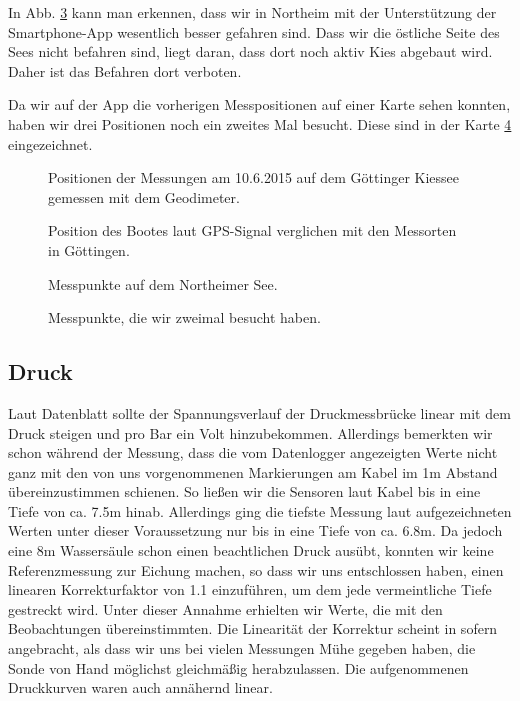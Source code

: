 \documentclass[12pt,a4paper,titlepage,headinclude,bibtotoc]{scrartcl}
\numberwithin{equation}{subsection}
\begin{document}
In Abb. \ref{fig:GPSNort} kann man erkennen, dass wir in Northeim mit der Unterstützung der Smartphone-App wesentlich besser gefahren sind.
Dass wir die östliche Seite des Sees nicht befahren sind, liegt daran, dass dort noch aktiv Kies abgebaut wird.
Daher ist das Befahren dort verboten.

Da wir auf der App die vorherigen Messpositionen auf einer Karte sehen konnten, haben wir drei Positionen noch ein zweites Mal besucht.
Diese sind in der Karte \ref{fig:GPSNortZweimal} eingezeichnet.


\begin{figure}[h]
\centering

\caption{Positionen der Messungen am 10.6.2015 auf dem Göttinger Kiessee gemessen mit dem Geodimeter.}
\label{fig:einzelGPSGoe}
\end{figure}
\begin{figure}[h]
\centering

\caption{Position des Bootes laut GPS-Signal verglichen mit den Messorten in Göttingen.}
\label{fig:GPSGoe}
\end{figure}

\begin{figure}[h]
	\centering
	
	\caption{Messpunkte auf dem Northeimer See.}
	\label{fig:GPSNort}
\end{figure}
\begin{figure}[h]
	\centering
	
	\caption{Messpunkte, die wir zweimal besucht haben.}
	\label{fig:GPSNortZweimal}
\end{figure}




\subsection{Druck}
\label{sec:ausdruck}
Laut Datenblatt sollte der Spannungsverlauf der Druckmessbrücke linear mit dem Druck steigen und pro Bar ein Volt hinzubekommen.
Allerdings bemerkten wir schon während der Messung, dass die vom Datenlogger angezeigten Werte nicht ganz mit den von uns vorgenommenen Markierungen am Kabel im 1m Abstand übereinzustimmen schienen.
So ließen wir die Sensoren laut Kabel bis in eine Tiefe von ca. 7.5m hinab.
Allerdings ging die tiefste Messung laut aufgezeichneten Werten unter dieser Voraussetzung nur bis in eine Tiefe von ca. 6.8m.
Da jedoch eine 8m Wassersäule schon einen beachtlichen Druck ausübt, konnten wir keine Referenzmessung zur Eichung machen, so dass wir uns entschlossen haben, einen linearen Korrekturfaktor von 1.1 einzuführen, um dem jede vermeintliche Tiefe gestreckt wird.
Unter dieser Annahme erhielten wir Werte, die mit den Beobachtungen übereinstimmten.
Die Linearität der Korrektur scheint in sofern angebracht, als dass wir uns bei vielen Messungen Mühe gegeben haben, die Sonde von Hand möglichst gleichmäßig herabzulassen.
Die aufgenommenen Druckkurven waren auch annähernd linear.
\end{document}
